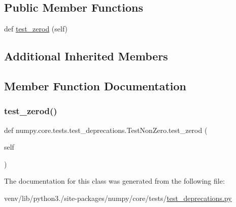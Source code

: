 \subsection*{Public Member Functions}
\begin{DoxyCompactItemize}
\item 
def \hyperlink{classnumpy_1_1core_1_1tests_1_1test__deprecations_1_1TestNonZero_ae475b0f6a85ac8b0929f9ce58aad8061}{test\+\_\+zerod} (self)
\end{DoxyCompactItemize}
\subsection*{Additional Inherited Members}


\subsection{Member Function Documentation}
\mbox{\label{classnumpy_1_1core_1_1tests_1_1test__deprecations_1_1TestNonZero_ae475b0f6a85ac8b0929f9ce58aad8061}} 
\subsubsection{\texorpdfstring{test\+\_\+zerod()}{test\_zerod()}}
{\footnotesize\ttfamily def numpy.\+core.\+tests.\+test\+\_\+deprecations.\+Test\+Non\+Zero.\+test\+\_\+zerod (\begin{DoxyParamCaption}\item[{}]{self }\end{DoxyParamCaption})}



The documentation for this class was generated from the following file\+:\begin{DoxyCompactItemize}
\item 
venv/lib/python3./site-\/packages/numpy/core/tests/\hyperlink{core_2tests_2test__deprecations_8py}{test\+\_\+deprecations.\+py}\end{DoxyCompactItemize}
